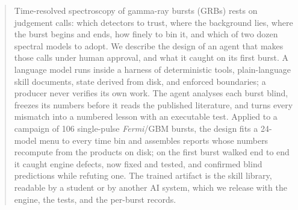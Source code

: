 \begin{abstract}
Time-resolved spectroscopy of gamma-ray bursts (GRBs) rests on judgement
calls: which detectors to trust, where the background lies, where the
burst begins and ends, how finely to bin it, and which of two dozen
spectral models to adopt. We describe the design of an agent that makes
those calls under human approval, and what it caught on its first burst.
A language model runs inside a harness of deterministic tools,
plain-language skill documents, state derived from disk, and enforced
boundaries; a producer never verifies its own work. The agent analyses
each burst blind, freezes its numbers before it reads the published
literature, and turns every mismatch into a numbered lesson with an
executable test. Applied to a campaign of 106 single-pulse
\textit{Fermi}/GBM bursts, the design fits a 24-model menu to every time
bin and assembles reports whose numbers recompute from the products on
disk; on the first burst walked end to end it caught engine defects, now
fixed and tested, and confirmed blind predictions while refuting one.
The trained artifact is the skill library, readable by a student or by
another AI system, which we release with the engine, the tests, and the
per-burst records.
\end{abstract}
